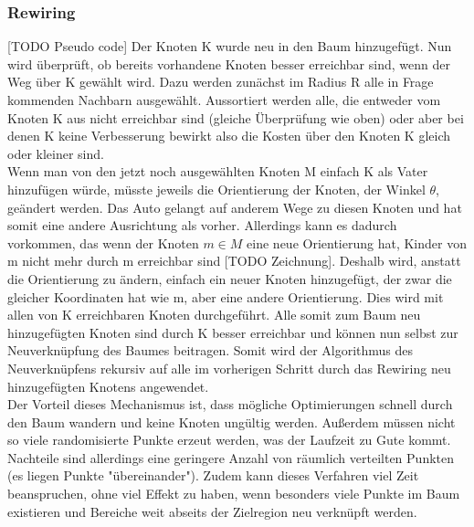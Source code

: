 \subsubsection{Rewiring}
[TODO Pseudo code] Der Knoten K wurde neu in den Baum hinzugefügt. Nun wird überprüft, ob bereits vorhandene Knoten besser erreichbar sind, wenn der Weg über K gewählt wird.
Dazu werden zunächst im Radius R alle in Frage kommenden Nachbarn ausgewählt. Aussortiert werden alle, die entweder vom Knoten K aus nicht erreichbar sind (gleiche Überprüfung wie oben) oder aber bei denen K keine Verbesserung bewirkt also die Kosten über den Knoten K gleich oder kleiner sind. \\
Wenn man von den jetzt noch ausgewählten Knoten M einfach K als Vater hinzufügen würde, müsste jeweils die Orientierung der Knoten, der Winkel $\theta$, geändert werden. Das Auto gelangt auf anderem Wege zu diesen Knoten und hat somit eine andere Ausrichtung als vorher. Allerdings kann es dadurch vorkommen, das wenn der Knoten $m \in M$ eine neue Orientierung hat, Kinder von m nicht mehr durch m erreichbar sind [TODO Zeichnung]. Deshalb wird, anstatt die Orientierung zu ändern, einfach ein neuer Knoten hinzugefügt, der zwar die gleicher Koordinaten hat wie m, aber eine andere Orientierung. Dies wird mit allen von K erreichbaren Knoten durchgeführt. Alle somit zum Baum neu hinzugefügten Knoten sind durch K besser erreichbar und können nun selbst zur Neuverknüpfung des Baumes beitragen. Somit wird der Algorithmus des Neuverknüpfens rekursiv auf alle im vorherigen Schritt durch das Rewiring neu hinzugefügten Knotens angewendet. \\
Der Vorteil dieses Mechanismus ist, dass mögliche Optimierungen schnell durch den Baum wandern und keine Knoten ungültig werden. Außerdem müssen nicht so viele randomisierte Punkte erzeut werden, was der Laufzeit zu Gute kommt. Nachteile sind allerdings eine geringere Anzahl von räumlich verteilten Punkten (es liegen Punkte "übereinander"). Zudem kann dieses Verfahren viel Zeit beanspruchen, ohne viel Effekt zu haben, wenn besonders viele Punkte im Baum existieren und Bereiche weit abseits der Zielregion neu verknüpft werden.



